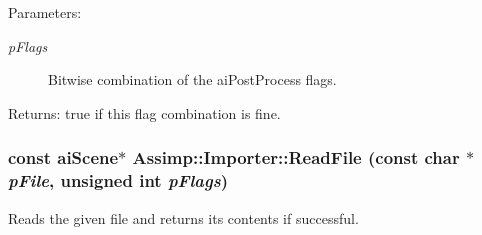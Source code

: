 \begin{Desc}
\item[Parameters:]
\begin{description}
\item[{\em pFlags}]Bitwise combination of the aiPostProcess flags. \end{description}
\end{Desc}
\begin{Desc}
\item[Returns:]true if this flag combination is fine. \end{Desc}
\hypertarget{class_assimp_1_1_importer_174418ab41d5b8bc51a044895cb991e5}{
\subsubsection[ReadFile]{\setlength{\rightskip}{0pt plus 5cm}const {\bf aiScene}$\ast$ Assimp::Importer::ReadFile (const char $\ast$ {\em pFile}, \/  unsigned int {\em pFlags})}}
\label{class_assimp_1_1_importer_174418ab41d5b8bc51a044895cb991e5}


Reads the given file and returns its contents if successful.

